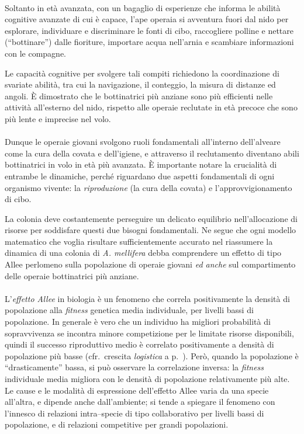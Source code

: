 \paragraph{}
Soltanto in età avanzata, con un bagaglio di esperienze che informa le abilità cognitive avanzate di cui è capace, l'ape operaia si avventura fuori dal nido per esplorare, individuare e discriminare le fonti di cibo, raccogliere polline e nettare (``bottinare'') dalle fioriture, importare acqua nell'arnia e scambiare informazioni con le compagne.

Le capacità cognitive per svolgere tali compiti richiedono la coordinazione di svariate abilità, tra cui la navigazione, il conteggio, la misura di distanze ed angoli.
È dimostrato che le bottinatrici più anziane sono più efficienti nelle attività all'esterno del nido, rispetto alle operaie reclutate in età precoce che sono più lente e imprecise nel volo.

\paragraph{}
Dunque le operaie giovani svolgono ruoli fondamentali all'interno dell'alveare come la cura della covata e dell'igiene, e attraverso il reclutamento diventano abili bottinatrici in volo in età più avanzata.
È importante notare la crucialità di entrambe le dinamiche, perché riguardano due aspetti fondamentali di ogni organismo vivente: la \emph{riproduzione} (la cura della covata) e l'approvvigionamento di cibo.

La colonia deve costantemente perseguire un delicato equilibrio nell'allocazione di risorse per soddisfare questi due bisogni fondamentali.
Ne segue che ogni modello matematico che voglia risultare sufficientemente accurato nel riassumere la dinamica di una colonia di \emph{A. mellifera} debba comprendere un effetto di tipo Allee perlomeno sulla popolazione di operaie giovani
\emph{ed anche} sul compartimento delle operaie bottinatrici più anziane.

\paragraph{}
\label{par:alleeEffect}
L'\emph{effetto Allee} in biologia è un fenomeno che correla positivamente la densità di popolazione alla
\emph{fitness} genetica media individuale, per livelli bassi di popolazione.
In generale è vero che un individuo ha migliori probabilità di sopravvivenza se incontra minore competizione per le
limitate risorse disponibili, quindi il successo riproduttivo medio è correlato positivamente a densità di popolazione
più basse (cfr.~crescita \emph{logistica} a p.~\pageref{sec:logistic}).
Però, quando la popolazione è ``drasticamente'' bassa, si può osservare la correlazione inversa: la \emph{fitness}
individuale media migliora con le densità di popolazione relativamente più alte.
Le cause e le modalità di espressione dell'effetto Allee varia da una specie all'altra, e dipende anche dall'ambiente;
si tende a spiegare il fenomeno con l'innesco di relazioni intra--specie di tipo collaborativo per livelli bassi di
popolazione, e di relazioni competitive per grandi popolazioni.

